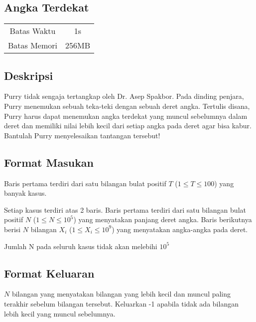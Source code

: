 \documentclass{article}
\begin{document}
\begin{center}

    
    \section*{Angka Terdekat} %

    \begin{tabular}{ | c c | }
        \hline
        Batas Waktu  & 1s \\    %
        Batas Memori & 256MB \\  %
        \hline
    \end{tabular}
\end{center}

\subsection*{Deskripsi}

Purry tidak sengaja tertangkap oleh Dr. Asep Spakbor. Pada dinding penjara, Purry menemukan sebuah teka-teki dengan sebuah deret angka. Tertulis disana, Purry harus dapat menemukan angka terdekat yang muncul sebelumnya dalam deret dan memiliki nilai lebih kecil dari setiap angka pada deret agar bisa kabur. Bantulah Purry menyelesaikan tantangan tersebut!

\subsection*{Format Masukan}

Baris pertama terdiri dari satu bilangan bulat positif $T$ ($1 \leq T \leq 100$)  yang banyak kasus.

Setiap kasus terdiri atas 2 baris. Baris pertama terdiri dari satu bilangan bulat positif $N$ ($1 \leq N \leq 10^{5}$)  yang menyatakan panjang deret angka.
Baris berikutnya berisi $N$ bilangan $X_i$ ($1 \leq X_i \leq 10^{9}$) yang menyatakan angka-angka pada deret.

Jumlah N pada seluruh kasus tidak akan melebihi $10^5$

\subsection*{Format Keluaran}

$N$ bilangan yang menyatakan bilangan yang lebih kecil dan muncul paling terakhir sebelum bilangan tersebut. Keluarkan -1 apabila tidak ada bilangan lebih kecil yang muncul sebelumnya.
\end{document}

